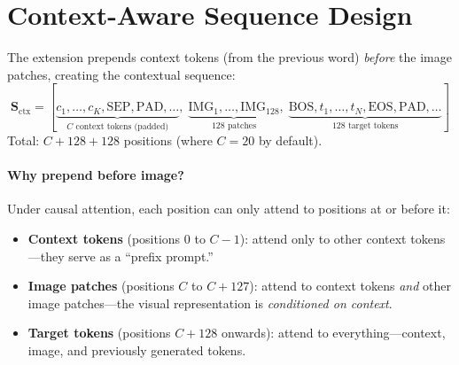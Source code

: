 \documentclass[11pt, a4paper]{report}
\begin{document}
\section{Context-Aware Sequence Design}
\label{sec:context-sequence}

The extension prepends context tokens (from the previous word) \emph{before} the image patches, creating the contextual sequence:
\begin{equation}
  \mathbf{S}_{\mathrm{ctx}} = [\underbrace{c_1, \ldots, c_K, \text{SEP}, \text{PAD}, \ldots}_{\text{$C$ context tokens (padded)}},\; \underbrace{\text{IMG}_1, \ldots, \text{IMG}_{128}}_{\text{128 patches}},\; \underbrace{\text{BOS}, t_1, \ldots, t_N, \text{EOS}, \text{PAD}, \ldots}_{\text{128 target tokens}}]
  \label{eq:context-sequence}
\end{equation}
Total: $C + 128 + 128$ positions (where $C = 20$ by default).

\paragraph{Why prepend before image?} Under causal attention, each position can only attend to positions at or before it:
\begin{itemize}[leftmargin=2em]
  \item \textbf{Context tokens} (positions 0 to $C{-}1$): attend only to other context tokens---they serve as a ``prefix prompt.''
  \item \textbf{Image patches} (positions $C$ to $C{+}127$): attend to context tokens \emph{and} other image patches---the visual representation is \emph{conditioned on context}.
  \item \textbf{Target tokens} (positions $C{+}128$ onwards): attend to everything---context, image, and previously generated tokens.
\end{itemize}
\end{document}
